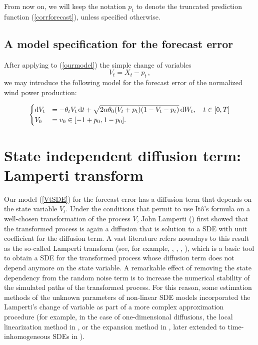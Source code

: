 \documentclass[11pt]{article}
\theoremstyle{definition}
\begin{document}
From now on, we will keep the notation $p_t$ to denote the truncated prediction function (\ref{corrforecast}), unless specified otherwise. 

\subsection{A model specification for the forecast error}
 After applying to (\ref{ourmodel}) the simple change of variables $$V_t = X_t - p_t \,,$$ we may introduce the following model for the forecast error of the normalized wind power production: 

\begin{equation}
\begin{cases}
\dif V_t&=  - \theta_t V_t\dif t + \sqrt{2 \alpha \theta_0 (V_t +p_t ) (1-V_t-p_t)}\dif W_t, \quad t \in [0,T]  \\
V_0&=  v_0\in [-1 + p_0,1 - p_0].
\end{cases}  \label{VtSDE}
\end{equation}



\section{State independent diffusion term: Lamperti transform} \label{Section_4}

Our model (\ref{VtSDE}) for the forecast error has a diffusion term that depends on the state variable $V_t$. Under the conditions that permit to use It\^{o}'s formula on a well-chosen transformation of the process $V$, John Lamperti (\cite{lamp}) first showed that the transformed process is again a diffusion that is solution to a SDE with unit coefficient for the diffusion term. 
A vast literature refers nowadays to this result as the so-called Lamperti transform (see, for example, \cite[40--41]{iacus1}, \cite{moma}, \cite[199--203]{pani}, \cite[98--100]{saso}), which is a basic tool to obtain a SDE for the transformed process whose diffusion term does not depend anymore on the state variable. A remarkable effect of removing the state dependency from the random noise term is to increase the numerical stability of the simulated paths of the transformed process. 
For this reason, some estimation methods of the unknown parameters of non-linear SDE models incorporated the Lamperti's change of variable as part of a more complex approximation procedure (for example, in the case of one-dimensional diffusions, the local linearization method in  \cite{shoz}, or the expansion method in \cite{ait}, later extended to time-inhomogeneous SDEs in \cite{eglix}).
\end{document}
